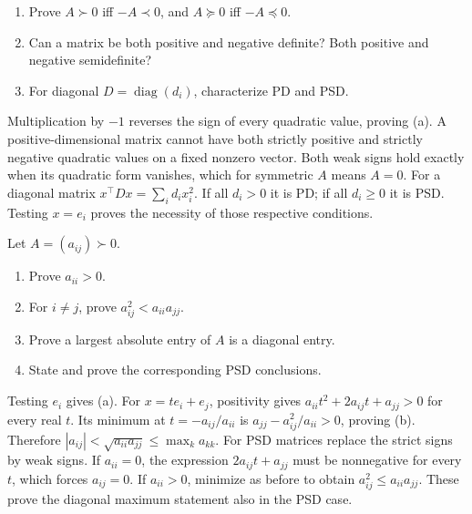 \begin{problem}\label{ex:09:signs}
\begin{enumerate}
\item Prove \(A\succ0\) iff \(-A\prec0\), and \(A\succeq0\) iff
\(-A\preceq0\).
\item Can a matrix be both positive and negative definite? Both positive
and negative semidefinite?
\item For diagonal \(D=\operatorname{diag}(d_i)\), characterize PD and PSD.
\end{enumerate}
\end{problem}
\begin{solution}
Multiplication by \(-1\) reverses the sign of every quadratic value,
proving (a).
A positive-dimensional matrix cannot have both strictly positive and
strictly negative quadratic values on a fixed nonzero vector.
Both weak signs hold exactly when its quadratic form vanishes, which
for symmetric \(A\) means \(A=0\).
For a diagonal matrix \(x^\top Dx=\sum_i d_ix_i^2\).
If all \(d_i>0\) it is PD; if all \(d_i\geqslant0\) it is PSD.
Testing \(x=e_i\) proves the necessity of those respective conditions.
\end{solution}

\begin{problem}\label{ex:09:entries}
Let \(A=(a_{ij})\succ0\).
\begin{enumerate}
\item Prove \(a_{ii}>0\).
\item For \(i\ne j\), prove \(a_{ij}^2<a_{ii}a_{jj}\).
\item Prove a largest absolute entry of \(A\) is a diagonal entry.
\item State and prove the corresponding PSD conclusions.
\end{enumerate}
\end{problem}
\begin{solution}
Testing \(e_i\) gives (a).
For \(x=te_i+e_j\), positivity gives
\(a_{ii}t^2+2a_{ij}t+a_{jj}>0\) for every real \(t\).
Its minimum at \(t=-a_{ij}/a_{ii}\) is
\(a_{jj}-a_{ij}^2/a_{ii}>0\), proving (b).
Therefore
\(|a_{ij}|<\sqrt{a_{ii}a_{jj}}\leqslant\max_k a_{kk}\).
For PSD matrices replace the strict signs by weak signs.
If \(a_{ii}=0\), the expression \(2a_{ij}t+a_{jj}\) must be nonnegative
for every \(t\), which forces \(a_{ij}=0\). If \(a_{ii}>0\), minimize
as before to obtain \(a_{ij}^2\leqslant a_{ii}a_{jj}\).
These prove the diagonal maximum statement also in the PSD case.
\end{solution}

